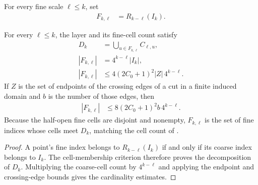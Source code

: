 \begin{definition}
    \label{def:area_law_fine_layer_indices}
    \leanok
    For every fine scale $\ell\le k$, set
    \begin{align}
        F_{k,\ell} & =R_{k-\ell}(I_k).
    \end{align}
\end{definition}

\begin{lemma}
    \label{thm:area_law_fine_layer_count}
    \leanok
    For every $\ell\le k$, the layer and its fine-cell count satisfy
    \begin{align}
        D_k          & =\bigcup_{u\in F_{k,\ell}} C_{\ell,u}, \\
        |F_{k,\ell}| & =4^{k-\ell}|I_k|,                      \\
        |F_{k,\ell}| & \le4(2C_0+1)^2|Z|\,4^{k-\ell}.
    \end{align}
    If $Z$ is the set of endpoints of the crossing edges of a cut in a
    finite induced domain and $b$ is the number of those edges, then
    \begin{align}
        |F_{k,\ell}| & \le8(2C_0+1)^2b\,4^{k-\ell}.
    \end{align}
    Because the half-open fine cells are disjoint and nonempty, $F_{k,\ell}$
    is the set of fine indices whose cells meet $D_k$, matching the
    cell count of \cite[Section~11]{OpenAI2026AreaLaw}.
\end{lemma}
\begin{proof}\leanok
    A point's fine index belongs to $R_{k-\ell}(I_k)$ if and only if its
    coarse index belongs to $I_k$. The cell-membership criterion therefore
    proves the decomposition of $D_k$. Multiplying the coarse-cell count by
    $4^{k-\ell}$ and applying the endpoint and crossing-edge bounds gives
    the cardinality estimates.
\end{proof}

